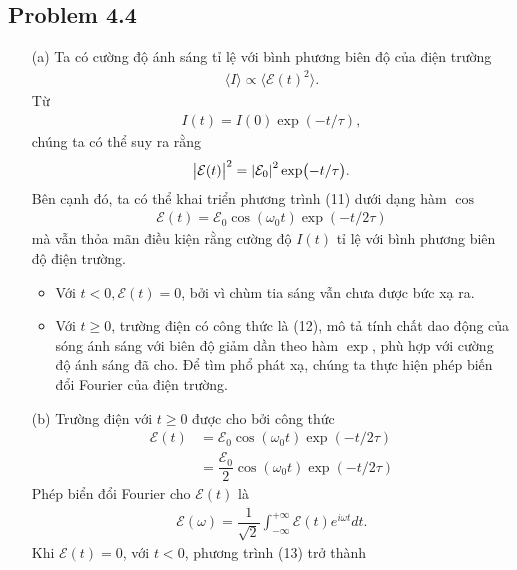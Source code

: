 \documentclass{article}
\newcommand{\f}[2]{\dfrac{#1}{#2}}
\begin{document}
\subsection*{Problem 4.4}
\begin{enumerate}
	\item[(a)] Ta có cường độ ánh sáng tỉ lệ với bình phương biên độ của điện trường
	      \begin{align}
		      \langle I \rangle \propto  \langle \mathcal{E}(t)^2 \rangle.
	      \end{align}
	      Từ
	      \begin{align}
		      I(t) = I(0) \exp(-t/\tau),
	      \end{align}
	      chúng ta có thể suy ra rằng
	      \begin{align}
		      \abs{\mathcal{E}(t)}^2 = \abs{\mathcal{E}_0}^2 \exp(-t/\tau).
	      \end{align}
	      Bên cạnh đó, ta có thể khai triển phương trình (11) dưới dạng hàm $\cos$
	      \begin{align}
		      \mathcal{E}(t) = \mathcal{E}_0 \cos(\omega_0 t) \exp(-t/2\tau)
	      \end{align}
	      mà vẫn thỏa mãn điều kiện rằng cường độ $I(t)$ tỉ lệ với bình phương biên độ điện trường.
	      \begin{itemize}
		      \item Với $t<0, \mathcal{E}(t) = 0$, bởi vì chùm tia sáng vẫn chưa được bức xạ ra.
		      \item Với $t \geq 0$, trường điện có công thức là (12), mô tả tính chất dao động của sóng ánh sáng với biên độ giảm dần theo hàm $\exp$, phù hợp với cường độ ánh sáng đã cho. Để tìm phổ phát xạ, chúng ta thực hiện phép biến đổi Fourier của điện trường.
	      \end{itemize}
	\item[(b)] Trường điện với $t \geq 0$ được cho bởi công thức
	      \begin{align*}
		      \mathcal{E}(t)
		       & = \mathcal{E}_0 \cos(\omega_0 t) \exp(-t/2\tau)        \\
		       & = \f{\mathcal{E}_0}{2} \cos(\omega_0 t) \exp(-t/2\tau)
	      \end{align*}
	      Phép biển đổi Fourier cho $\mathcal{E}(t)$ là
	      \begin{align}
		      \mathcal{E}(\omega) = \f{1}{\sqrt{2}} \int_{-\infty}^{+\infty} \mathcal{E}(t) e^{i\omega t} dt.
	      \end{align}
	      Khi $\mathcal{E}(t) = 0$, với $t < 0$, phương trình (13) trở thành

\end{enumerate}
\end{document}
